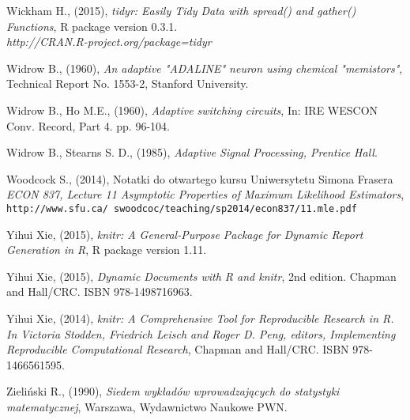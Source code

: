 \begin{thebibliography}{99}
 Wickham H., (2015), \textit{tidyr: Easily Tidy Data with spread() and gather() Functions}, R package version 0.3.1. \\  \textit{http://CRAN.R-project.org/package=tidyr}

 Widrow B., (1960), \textit{An adaptive "ADALINE" neuron using chemical "memistors"}, Technical Report No. 1553-2, Stanford University.

 Widrow B., Ho M.E., (1960), \textit{Adaptive switching circuits}, In: IRE WESCON Conv.
Record, Part 4. pp. 96-104.

 Widrow B., Stearns S. D., (1985), \textit{Adaptive Signal Processing, Prentice Hall}.


  Woodcock S., (2014), Notatki do otwartego kursu Uniwersytetu Simona Frasera \textit{ECON 837, Lecture 11 Asymptotic Properties of Maximum Likelihood Estimators}, \\ \texttt{http://www.sfu.ca/~swoodcoc/teaching/sp2014/econ837/11.mle.pdf}


 Yihui Xie, (2015), \textit{knitr: A General-Purpose Package for Dynamic Report Generation in R}, R package version 1.11.

 Yihui Xie, (2015), \textit{Dynamic Documents with R and knitr}, 2nd edition. Chapman and Hall/CRC. ISBN 978-1498716963.

 Yihui Xie, (2014), \textit{knitr: A Comprehensive Tool for Reproducible Research in R. In Victoria Stodden, Friedrich Leisch and Roger D. Peng, editors, Implementing Reproducible Computational Research}, Chapman and Hall/CRC. ISBN 978-1466561595.


 Zieliński R., (1990), \textit{Siedem wykładów wprowadzających do statystyki matematycznej}, Warszawa, Wydawnictwo Naukowe PWN.


\end{thebibliography}

